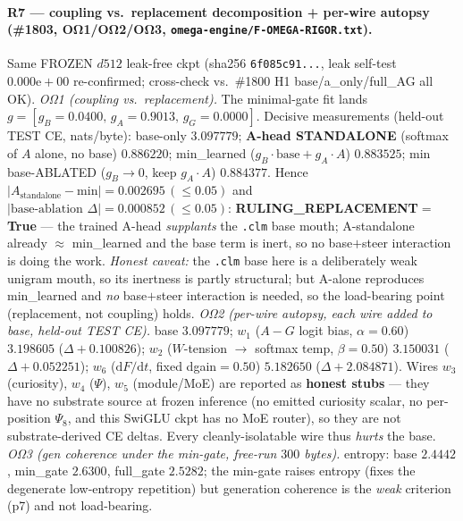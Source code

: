\documentclass[11pt]{article}
\begin{document}
\paragraph{R7 --- coupling vs.\ replacement decomposition + per-wire autopsy (\#1803, OΩ1/OΩ2/OΩ3,
\texttt{omega-engine/F-OMEGA-RIGOR.txt}).} Same FROZEN $d512$ leak-free ckpt (sha256
\texttt{6f085c91...}, leak self-test $0.000\mathrm{e}{+}00$ re-confirmed; cross-check vs.\ \#1800
H1 base/a\_only/full\_AG all OK). \emph{OΩ1 (coupling vs.\ replacement).} The minimal-gate fit
lands $g{=}[g_B{=}0.0400,\,g_A{=}0.9013,\,g_G{=}0.0000]$. Decisive measurements (held-out TEST
CE, nats/byte): base-only $3.097779$; \textbf{A-head STANDALONE} (softmax of $A$ alone, no base)
$\mathbf{0.886220}$; min\_learned ($g_B\!\cdot\!\text{base}+g_A\!\cdot\!A$) $0.883525$; min
base-ABLATED ($g_B\!\to\!0$, keep $g_A\!\cdot\!A$) $0.884377$. Hence $|A_\text{standalone}-\text{min}|
=0.002695\,(\le0.05)$ and $|\text{base-ablation }\Delta|=0.000852\,(\le0.05)$:
\textbf{RULING\_REPLACEMENT$=$True} --- the trained A-head \emph{supplants} the \texttt{.clm} base
mouth; A-standalone already $\approx$ min\_learned and the base term is inert, so no base$+$steer
interaction is doing the work. \emph{Honest caveat:} the \texttt{.clm} base here is a deliberately
weak unigram mouth, so its inertness is partly structural; but A-alone reproduces min\_learned and
\emph{no} base$+$steer interaction is needed, so the load-bearing point (replacement, not coupling)
holds.
\emph{OΩ2 (per-wire autopsy, each wire added to base, held-out TEST CE).} base $3.097779$;
$w_1$ ($A{-}G$ logit bias, $\alpha{=}0.60$) $3.198605$ ($\Delta{+}0.100826$);
$w_2$ ($W$-tension $\to$ softmax temp, $\beta{=}0.50$) $3.150031$ ($\Delta{+}0.052251$);
$w_6$ ($\mathrm{d}F/\mathrm{d}t$, fixed dgain$=0.50$) $5.182650$ ($\Delta{+}2.084871$). Wires
$w_3$ (curiosity), $w_4$ ($\Psi$), $w_5$ (module/MoE) are reported as \textbf{honest stubs} ---
they have no substrate source at frozen inference (no emitted curiosity scalar, no per-position
$\Psi_8$, and this SwiGLU ckpt has no MoE router), so they are not substrate-derived CE deltas.
Every cleanly-isolatable wire thus \emph{hurts} the base. \emph{OΩ3 (gen coherence under the
min-gate, free-run $300$ bytes).} entropy: base $2.4442$, min\_gate $2.6300$, full\_gate
$2.5282$; the min-gate raises entropy (fixes the degenerate low-entropy repetition) but
generation coherence is the \emph{weak} criterion (p7) and not load-bearing.
\end{document}
